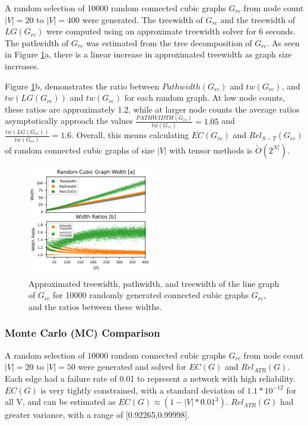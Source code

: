 \documentclass[12pt,twocolumn]{article}
\begin{document}
A random selection of 10000 random connected cubic graphs \(G_{rc}\) from node count \(|V|=20\) to \(|V|=400\) were generated. The treewidth of \(G_{rc}\) and the treewidth of \(LG(G_{rc})\) were computed using an approximate treewidth solver \cite{dell2018pace} for 6 seconds. The pathwidth of \(G_{rc}\) was estimated from the tree decomposition of \(G_{rc}\). As seen in Figure \ref{fig:Random Cubic Treewidth}a, there is a linear increase in approximated treewidth as graph size increases.

Figure \ref{fig:Random Cubic Treewidth}b, demonstrates the ratio between \(Pathwidth(G_{rc})\) and \(tw(G_{rc})\), and \(tw(LG(G_{rc}))\) and \(tw(G_{rc})\) for each random graph. At low node counts, these ratios are approximately 1.2, while at larger node counts the average ratios asymptotically approach the values \(\frac{PATHWIDTH(G_{rc})}{tw(G_{rc})}=1.05\) and \(\frac{tw(LG(G_{rc}))}{tw(G_{rc})}=1.6\). Overall, this means calculating \(EC(G_{rc})\) and \(Rel_{S-T}(G_{rc})\) of random connected cubic graphs of size \(|V|\) with tensor methods is \(\widetilde{O}(2^{|V|})\).

\begin{figure}[t]
\caption{Approximated treewidth, pathwidth, and treewidth of the line graph of $G_{rc}$ for 10000 randomly generated connected cubic graphs $G_{rc}$, and the ratios between these widths.}
\label{fig:Random Cubic Treewidth}
\includegraphics[width=0.5\textwidth]{../figures/RcubicWidth.png}
\end{figure}

\hypertarget{monte-carlo-mc-comparison-1}{%
\subsubsection{Monte Carlo (MC) Comparison}\label{monte-carlo-mc-comparison-1}}

A random selection of 10000 random connected cubic graphs \(G_{rc}\) from node count \(|V|=20\) to \(|V|=50\) were generated and solved for \(EC(G)\) and \(Rel_{ATR}(G)\). Each edge had a failure rate of 0.01 to represent a network with high reliability. \(EC(G)\) is very tightly constrained, with a standard deviation of \(1.1*10^{-12}\) for all \textbar V\textbar, and can be estimated as \(EC(G) \approx (1-|V|*0.01^3)\). \(Rel_{ATR}(G)\) had greater variance, with a range of {[}0.92265,0.99998{]}.
\end{document}
